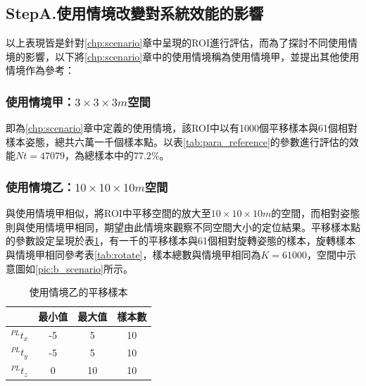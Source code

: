 




\subsection{StepA.使用情境改變對系統效能的影響}
\label{chp:scene_effect}
以上表現皆是針對\ref{chp:scenario}章中呈現的ROI進行評估，而為了探討不同使用情境的影響，以下將\ref{chp:scenario}章中的使用情境稱為使用情境甲，並提出其他使用情境作為參考：

\subsubsection{使用情境甲：$3\times 3\times 3m$空間}

即為\ref{chp:scenario}章中定義的使用情境，該ROI中以有1000個平移樣本與61個相對樣本姿態，總共六萬一千個樣本點。以表\ref{tab:para_reference}的參數進行評估的效能$Nt=47079$，為總樣本中的$77.2\%$。

\subsubsection{使用情境乙：$10\times 10\times 10m$空間}

與使用情境甲相似，將ROI中平移空間的放大至$10\times 10\times 10m$的空間，而相對姿態則與使用情境甲相同，期望由此情境來觀察不同空間大小的定位結果。平移樣本點的參數設定呈現於表\ref{tab:B_translate}，有一千的平移樣本與61個相對旋轉姿態的樣本，旋轉樣本與情境甲相同參考表\ref{tab:rotate}，樣本總數與情境甲相同為$K=61000$，空間中示意圖如\ref{pic:b_scenario}所示。

\begin{table}[htpb]
    \begin{center}
      \caption{使用情境乙的平移樣本}
      \label{tab:B_translate}
      \begin{tabular}{c|c|c|c} %
         & \textbf{最小值} & \textbf{最大值}&\textbf{樣本數}\\
        \hline
        $^{PL}t_x$ & -5 & 5&10\\
        $^{PL}t_y$ & -5 & 5&10\\
        $^{PL}t_z$ & 0 & 10 &10\\
      \end{tabular}
    \end{center}
  \end{table}


